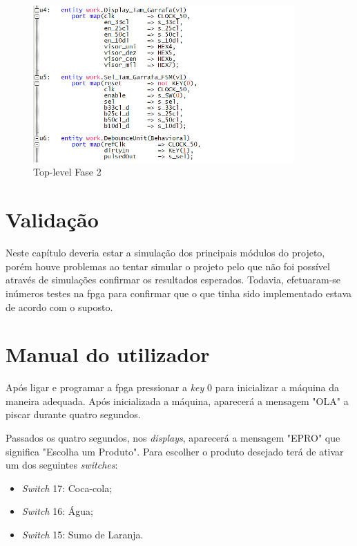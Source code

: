 \documentclass{report}
\begin{document}
\begin{figure}[H]
    \centering
    \includegraphics[width = 10cm]{TopLevelF2.png}
    \caption{Top-level Fase 2}
    \label{fig:TL2}
\end{figure}

\chapter{Validação}
\label{chap.validação}
Neste capítulo deveria estar a simulação dos principais módulos do projeto, porém houve problemas ao tentar simular o projeto pelo que não foi possível através de simulações confirmar os resultados esperados. Todavia, efetuaram-se inúmeros testes na \ac{fpga} para confirmar que o que tinha sido implementado estava de acordo com o suposto.

\chapter{Manual do utilizador}

Após ligar e programar a \ac{fpga} pressionar a \textit{key} 0 para inicializar a máquina da maneira adequada. Após inicializada a máquina, aparecerá a mensagem "OLA" a piscar durante quatro segundos.

Passados os quatro segundos, nos \textit{displays}, aparecerá a mensagem "EPRO" que significa "Escolha um Produto". Para escolher o produto desejado terá de ativar um dos seguintes \textit{switches}:

\begin{itemize}

\item \textit{Switch} 17: Coca-cola;
\item \textit{Switch} 16: Água;
\item \textit{Switch} 15: Sumo de Laranja.

\end{itemize}
\end{document}

